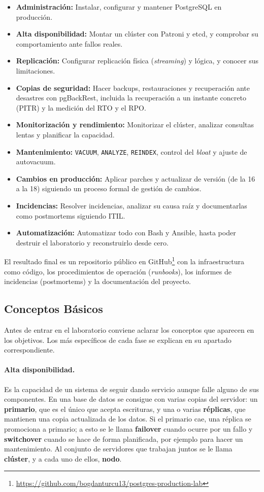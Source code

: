 \documentclass[11pt, a4paper, titlepage]{article}
\newcommand{\cod}[1]{\texttt{#1}}
\begin{document}
\begin{itemize}
    \item \textbf{Administración:} Instalar, configurar y mantener PostgreSQL en producción.
    \item \textbf{Alta disponibilidad:} Montar un clúster con Patroni y etcd, y comprobar su comportamiento ante fallos reales.
    \item \textbf{Replicación:} Configurar replicación física (\textit{streaming}) y lógica, y conocer sus limitaciones.
    \item \textbf{Copias de seguridad:} Hacer backups, restauraciones y recuperación ante desastres con pgBackRest, incluida la recuperación a un instante concreto (PITR) y la medición del RTO y el RPO.
    \item \textbf{Monitorización y rendimiento:} Monitorizar el clúster, analizar consultas lentas y planificar la capacidad.
    \item \textbf{Mantenimiento:} \cod{VACUUM}, \cod{ANALYZE}, \cod{REINDEX}, control del \textit{bloat} y ajuste de autovacuum.
    \item \textbf{Cambios en producción:} Aplicar parches y actualizar de versión (de la 16 a la 18) siguiendo un proceso formal de gestión de cambios.
    \item \textbf{Incidencias:} Resolver incidencias, analizar su causa raíz y documentarlas como postmortems siguiendo ITIL.
    \item \textbf{Automatización:} Automatizar todo con Bash y Ansible, hasta poder destruir el laboratorio y reconstruirlo desde cero.
\end{itemize}

El resultado final es un repositorio público en GitHub\footnote{\url{https://github.com/bogdanturcu13/postgres-production-lab}} con la infraestructura como código, los procedimientos de operación (\textit{runbooks}), los informes de incidencias (postmortems) y la documentación del proyecto.

\subsection{Conceptos Básicos}

Antes de entrar en el laboratorio conviene aclarar los conceptos que aparecen en los objetivos. Los más específicos de cada fase se explican en su apartado correspondiente.

\paragraph{Alta disponibilidad.} Es la capacidad de un sistema de seguir dando servicio aunque falle alguno de sus componentes. En una base de datos se consigue con varias copias del servidor: un \textbf{primario}, que es el único que acepta escrituras, y una o varias \textbf{réplicas}, que mantienen una copia actualizada de los datos. Si el primario cae, una réplica se promociona a primario; a esto se le llama \textbf{failover} cuando ocurre por un fallo y \textbf{switchover} cuando se hace de forma planificada, por ejemplo para hacer un mantenimiento. Al conjunto de servidores que trabajan juntos se le llama \textbf{clúster}, y a cada uno de ellos, \textbf{nodo}.
\end{document}

